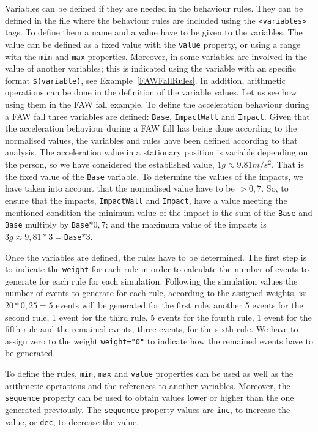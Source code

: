 \documentclass[review]{elsarticle}
\begin{document}
Variables can be defined if they are needed in the behaviour rules. They can be defined in the file where
the behaviour rules are included using the \texttt{<variables>} tags. To define them a name and a value 
have to be given to the variables. The value can be defined as a fixed value with the \texttt{value} 
property, or using a range with the \texttt{min} and \texttt{max} properties. Moreover, in some variables
are involved in the value of another variables; this is indicated using the variable with an specific 
format \texttt{\$(variable)}, see Example~\ref{FAWFallRules}. In addition, arithmetic operations can be 
done in the definition of the variable values. Let us see how using them in the FAW fall example. To 
define the acceleration behaviour during a FAW fall three variables are defined: \texttt{Base}, 
\texttt{ImpactWall} and \texttt{Impact}. Given that the acceleration behaviour during a FAW fall has
being done according to the normalised values, the variables and rules have been defined according to 
that analysis. The acceleration value in a stationary position is variable depending on the person, so 
we have considered the established value, $1g\approx9.81m/s^{2}$. That is the fixed value of the 
\texttt{Base} variable. To determine the values of the impacts, we have taken into account that the 
normalised value have to be $> 0,7$. So, to ensure that the impacts, \texttt{ImpactWall} and 
\texttt{Impact}, have a value meeting the mentioned condition the minimum value of the impact is the 
sum of the \texttt{Base} and \texttt{Base} multiply by \texttt{Base}$*0,7$; and the maximum value of the
impacts is $3g\approx9,81*3=$\texttt{Base}$*3$.

Once the variables are defined, the rules have to be determined. The first step is to indicate the 
\texttt{weight} for each rule in order to calculate the number of events to generate for each rule for 
each simulation. Following the simulation values the number of events to generate for each rule, according 
to the assigned weights, is: $20 * 0,25 = 5$ events will be generated for the first rule, another 5 events 
for the second rule, 1 event for the third rule, 5 events for the fourth rule, 1 event for the fifth
rule and the remained events, three events, for the sixth rule. We have to assign zero to the weight
\texttt{weight="0"} to indicate how the remained events have to be generated.

To define the rules, \texttt{min}, \texttt{max} and \texttt{value} properties can be used as well as the arithmetic 
operations and the references to another variables. Moreover, the \texttt{sequence} property can be used to obtain
values lower or higher than the one generated previously. The \texttt{sequence} property values are \texttt{inc}, 
to increase the value, or \texttt{dec}, to decrease the value. \newpage
\end{document}
